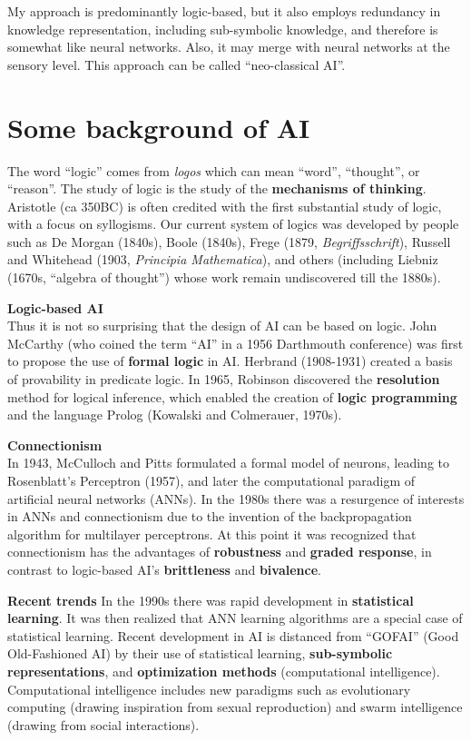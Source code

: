 \leftskip 0cm
My approach is predominantly logic-based, but it also employs redundancy in knowledge representation, including sub-symbolic knowledge, and therefore is somewhat like neural networks.  Also, it may merge with neural networks at the sensory level.  This approach can be called ``neo-classical AI''.

\section{Some background of AI}

The word ``logic'' comes from \textit{logos} which can mean ``word'', ``thought'', or ``reason''.  The study of logic is the study of the \textbf{mechanisms of thinking}.  Aristotle (ca 350BC) is often credited with the first substantial study of logic, with a focus on syllogisms.  Our current system of logics was developed by people such as De Morgan (1840s), Boole (1840s), Frege (1879, \textit{Begriffsschrift}), Russell and Whitehead (1903, \textit{Principia Mathematica}), and others (including Liebniz (1670s, ``algebra of thought'') whose work remain undiscovered till the 1880s).

\textbf{Logic-based AI}\\
Thus it is not so surprising that the design of AI can be based on logic.  John McCarthy (who coined the term ``AI'' in a 1956 Darthmouth conference) was first to propose the use of \textbf{formal logic} in AI.  Herbrand (1908-1931) created a basis of provability in predicate logic.  In 1965, Robinson discovered the \textbf{resolution} method for logical inference, which enabled the creation of \textbf{logic programming} and the language Prolog (Kowalski and Colmerauer, 1970s).

\textbf{Connectionism}\\
In 1943, McCulloch and Pitts formulated a formal model of neurons, leading to Rosenblatt's Perceptron (1957), and later the computational paradigm of artificial neural networks (ANNs).  In the 1980s there was a resurgence of interests in ANNs and connectionism due to the invention of the backpropagation algorithm for multilayer perceptrons.  At this point it was recognized that connectionism has the advantages of \textbf{robustness} and \textbf{graded response}, in contrast to logic-based AI's \textbf{brittleness} and \textbf{bivalence}.

\textbf{Recent trends}
In the 1990s there was rapid development in \textbf{statistical learning}.  It was then realized that ANN learning algorithms are a special case of statistical learning.  Recent development in AI is distanced from ``GOFAI'' (Good Old-Fashioned AI) by their use of statistical learning, \textbf{sub-symbolic representations}, and \textbf{optimization methods} (computational intelligence).  Computational intelligence includes new paradigms such as evolutionary computing (drawing inspiration from sexual reproduction) and swarm intelligence (drawing from social interactions).


